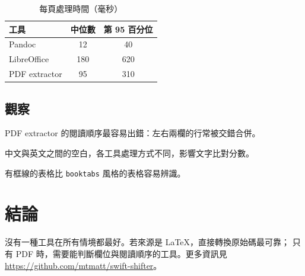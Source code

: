 \documentclass[11pt]{ctexart}
\begin{document}
\begin{table}[h]
  \centering
  \caption{每頁處理時間（毫秒）}
  \label{tab:speed}
  \begin{tabular}{l|c|c}
    \hline
    工具 & 中位數 & 第 95 百分位 \\
    \hline
    Pandoc        & 12  & 40  \\
    LibreOffice   & 180 & 620 \\
    PDF extractor & 95  & 310 \\
    \hline
  \end{tabular}
\end{table}

\subsection{觀察}

\begin{description}[style=nextline]
  \item[雙欄排版] PDF extractor 的閱讀順序最容易出錯：左右兩欄的行常被交錯合併。
  \item[中英混排] 中文與英文之間的空白，各工具處理方式不同，影響文字比對分數。
  \item[表格] 有框線的表格比 \texttt{booktabs} 風格的表格容易辨識。
\end{description}

\section{結論}

沒有一種工具在所有情境都最好。若來源是 \LaTeX{}，直接轉換原始碼最可靠；
只有 PDF 時，需要能判斷欄位與閱讀順序的工具。更多資訊見
\url{https://github.com/mtmatt/swift-shifter}。
\end{document}
